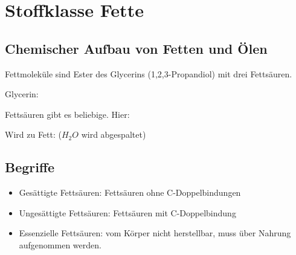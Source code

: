 \section{Stoffklasse Fette}

\subsection{Chemischer Aufbau von Fetten und Ölen}
Fettmoleküle sind Ester des Glycerins (1,2,3-Propandiol) mit drei Fettsäuren.

Glycerin:\\

Fettsäuren gibt es beliebige. Hier:\\

Wird zu Fett: ($H_2O$ wird abgespaltet) \\

\subsection{Begriffe}
\begin{itemize}
    \item Gesättigte Fettsäuren: Fettsäuren ohne C-Doppelbindungen
    \item Ungesättigte Fettsäuren: Fettsäuren mit C-Doppelbindung
    \item Essenzielle Fettsäuren: vom Körper nicht herstellbar, muss über Nahrung aufgenommen werden.
\end{itemize}

